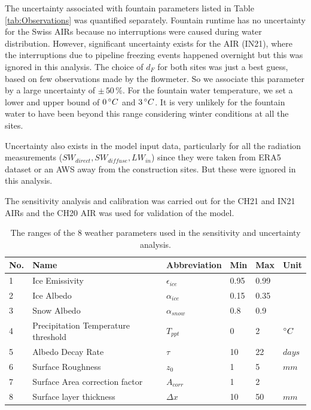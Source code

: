 \documentclass[utf8]{frontiersSCNS} %
\begin{document}
The uncertainty associated with fountain parameters listed in Table \ref{tab:Observations} was quantified
separately. Fountain runtime has no uncertainty for the Swiss AIRs because no interruptions were caused during
water distribution. However, significant uncertainty exists for the AIR (IN21), where the interruptions due to
pipeline freezing events happened overnight but this was ignored in this analysis. The choice of $d_F$ for both
sites was just a best guess, based on few observations made by the flowmeter. So we associate this parameter by a
large uncertainty of $\pm \,50\, \%$. For the fountain water temperature, we set a lower and upper bound of $0\,
	\degree C$ and $3\, \degree C$.  It is very unlikely for the fountain water to have been beyond this range
considering winter conditions at all the sites.

Uncertainty also exists in the model input data, particularly for all the radiation measurements ($SW_{direct},
	SW_{diffuse}, LW_{in}$) since they were taken from ERA5 dataset or an AWS away from the construction sites.
But these were ignored in this analysis.

The sensitivity analysis and calibration was carried out for the CH21 and IN21 AIRs and the CH20 AIR was used for
validation of the model.

\begin{table}
	\centering
	\caption{The ranges of the 8 weather parameters used in the sensitivity and uncertainty analysis.}
	\label{tab:parameters}
	\begin{tabular}{@{}llllll@{}}
		\toprule
		\textbf{No.} & \textbf{Name}                       & \textbf{Abbreviation} & \textbf{Min} & \textbf{Max} & \textbf{Unit} \\\midrule
		1            & Ice Emissivity                      & $\epsilon_{ice}$      & 0.95         & 0.99         &               \\
		2            & Ice Albedo                          & $\alpha_{ice}$        & 0.15         & 0.35         &               \\
		3            & Snow Albedo                         & $\alpha_{snow}$       & 0.8          & 0.9          &               \\
		4            & Precipitation Temperature threshold & $T_{ppt}$             & 0            & 2            & $\degree C$   \\
		5            & Albedo Decay Rate                   & $\tau$                & 10           & 22           & $days$        \\
		6            & Surface Roughness                   & $z_0$                 & 1            & 5            & $mm$          \\
		7            & Surface Area correction factor      & $A_{corr}$            & 1            & 2            &               \\
		8            & Surface layer thickness             & $\Delta x$            & 10           & 50           & $mm$          \\\bottomrule
	\end{tabular}
\end{table}
\end{document}
